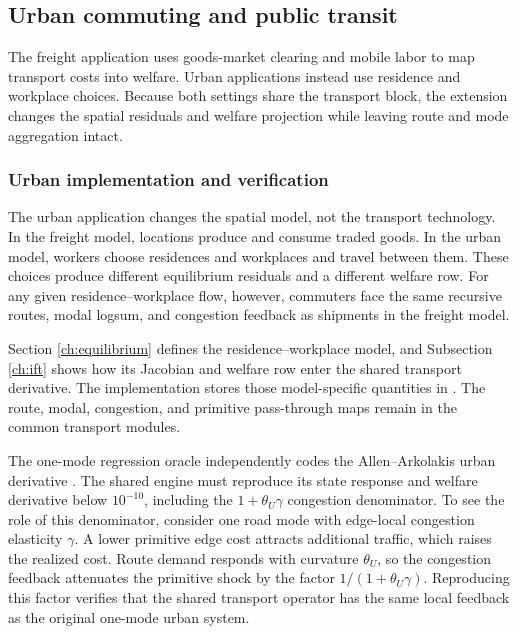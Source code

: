 \subsection{Urban commuting and public transit}
\label{ch:extensions}

The freight application uses goods-market clearing and mobile labor to map
transport costs into welfare. Urban applications instead use residence and
workplace choices. Because both settings share the transport block, the
extension changes the spatial residuals and welfare projection while leaving
route and mode aggregation intact.

\subsubsection{Urban implementation and verification}

The urban application changes the spatial model, not the transport
technology. In the freight model, locations produce and consume traded goods.
In the urban model, workers choose residences and workplaces and travel
between them. These choices produce different equilibrium residuals and a
different welfare row. For any given residence--workplace flow, however,
commuters face the same recursive routes, modal logsum, and congestion
feedback as shipments in the freight model.

Section \ref{ch:equilibrium} defines the residence--workplace model, and
Subsection \ref{ch:ift} shows how its Jacobian and welfare row enter the shared
transport derivative. The implementation stores those model-specific
quantities in . The route, modal, congestion, and primitive
pass-through maps remain in the common transport modules.

The one-mode regression oracle independently codes the Allen--Arkolakis
urban derivative \citep{AA_2022restud}. The shared engine must reproduce its
state response and welfare derivative below \(10^{-10}\), including the
\(1+\theta_U\gamma\) congestion denominator. To see the role of this
denominator, consider one road mode with edge-local congestion elasticity
\(\gamma\). A lower primitive edge cost attracts additional traffic, which
raises the realized cost. Route demand responds with curvature
\(\theta_U\), so the congestion feedback attenuates the primitive shock by
the factor \(1/(1+\theta_U\gamma)\). Reproducing this factor verifies that
the shared transport operator has the same local feedback as the original
one-mode urban system.


